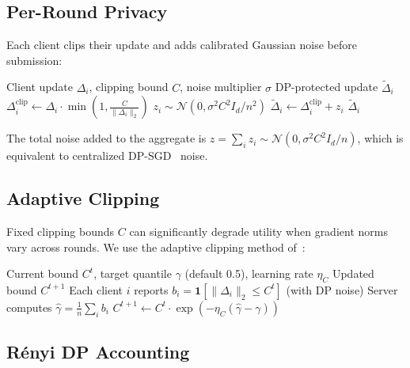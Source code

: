 \documentclass[11pt,a4paper]{article}
\newcommand{\NN}{\mathcal{N}}
\begin{document}
\subsection{Per-Round Privacy}

Each client clips their update and adds calibrated Gaussian noise before submission:

\begin{algorithm}[H]
\caption{DP Update Preparation}
\label{alg:dp}
\begin{algorithmic}[1]
\Require Client update $\Delta_i$, clipping bound $C$, noise multiplier $\sigma$
\Ensure DP-protected update $\tilde{\Delta}_i$
\State $\Delta_i^{\text{clip}} \leftarrow \Delta_i \cdot \min\left(1, \frac{C}{\|\Delta_i\|_2}\right)$ 
\State $z_i \sim \NN(0, \sigma^2 C^2 I_d / n^2)$ 
\State $\tilde{\Delta}_i \leftarrow \Delta_i^{\text{clip}} + z_i$
\State \Return $\tilde{\Delta}_i$
\end{algorithmic}
\end{algorithm}

The total noise added to the aggregate is $z = \sum_i z_i \sim \NN(0, \sigma^2 C^2 I_d / n)$, which is equivalent to centralized DP-SGD~\citep{abadi2016deep} noise.

\subsection{Adaptive Clipping}

Fixed clipping bounds $C$ can significantly degrade utility when gradient norms vary across rounds. We use the adaptive clipping method of~\citep{andrew2021differentially}:

\begin{algorithm}[H]
\caption{Adaptive Clipping Bound}
\label{alg:adaptive-clip}
\begin{algorithmic}[1]
\Require Current bound $C^t$, target quantile $\gamma$ (default 0.5), learning rate $\eta_C$
\Ensure Updated bound $C^{t+1}$
\State Each client $i$ reports $b_i = \mathbf{1}[\|\Delta_i\|_2 \leq C^t]$ (with DP noise)
\State Server computes $\hat{\gamma} = \frac{1}{n} \sum_i b_i$
\State $C^{t+1} \leftarrow C^t \cdot \exp(-\eta_C (\hat{\gamma} - \gamma))$
\end{algorithmic}
\end{algorithm}

\subsection{R\'enyi DP Accounting}
\end{document}
